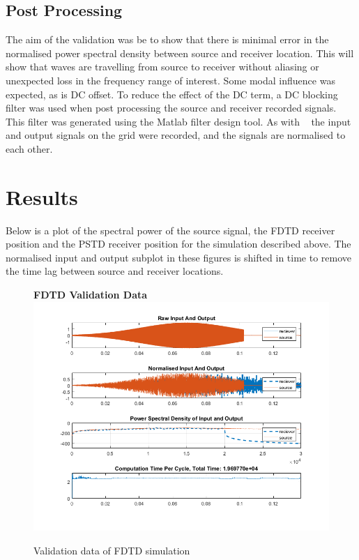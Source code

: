 \subsection{Post Processing}
The aim of the validation was be to show that there is minimal error in the normalised power spectral density between source and receiver location. This will show that waves are travelling from source to receiver without aliasing or unexpected loss in the frequency range of interest. Some modal influence was expected, as is DC offset. To reduce the effect of the DC term, a DC blocking filter was used when post processing the source and receiver recorded signals. This filter was generated using the Matlab filter design tool. As with ~\cite{Murphy2014} the input and output signals on the grid were recorded, and the signals are normalised to each other.\\

\section{Results}
Below is a plot of the spectral power of the source signal, the FDTD receiver position and the PSTD receiver position for the simulation described above. The normalised input and output subplot in these figures is shifted in time to remove the time lag between source and receiver locations.

\begin{figure}[H]
\centering
\textbf{FDTD Validation Data}
  \includegraphics[width=\textwidth]{./graphics/FDTDvalidationFinal.png}
  \caption{Validation data of FDTD simulation}
\end{figure}

